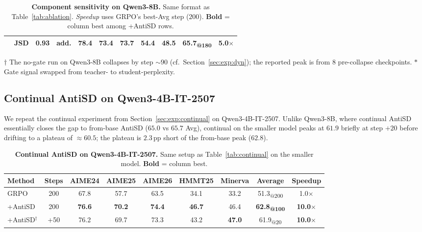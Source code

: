 \documentclass{llmxive}
\providecommand{\arraystretch}{0.95}
\begin{document}
\begin{table}[t]
\begin{tabular}{l|ccc|cccccc|c}
    \rowcolor{antisdrow}{}   & {JSD}        & {0.93}                              & {add.}                       & \textbf{78.4}   & \textbf{73.4}   & 73.7            & 54.4            & 48.5             & 65.7\textsubscript{@180}                           & 5.0$\times$          \\
    \bottomrule
  \end{tabular}
  \par\smallskip
  {\footnotesize $\dagger$ The no-gate run on Qwen3-8B collapses by step $\sim 90$ (cf.\ Section~\ref{sec:exp:dyn}); the reported peak is from $8$ pre-collapse checkpoints. $\ast$ Gate signal swapped from teacher- to student-perplexity.}
\caption{\textbf{Component sensitivity on Qwen3-8B.} Same format as Table~\ref{tab:ablation}. \emph{Speedup} uses GRPO's best-Avg step ($200$). \textbf{Bold} = column best among +AntiSD rows.}
\label{tab:ablation-qn}
\end{table}


\subsection{Continual AntiSD on Qwen3-4B-IT-2507}
\label{app:continual-q4}

We repeat the continual experiment from Section~\ref{sec:exp:continual} on Qwen3-4B-IT-2507. Unlike Qwen3-8B, where continual AntiSD essentially closes the gap to from-base AntiSD ($65.0$ vs $65.7$ Avg), continual on the smaller model peaks at $61.9$ briefly at step $+20$ before drifting to a plateau of $\approx 60.5$; the plateau is $2.3$\,pp short of the from-base peak ($62.8$).

\begin{table}[!htbp]
  \centering
  \small
  \setlength{\tabcolsep}{6pt}
  \renewcommand{\arraystretch}{1.0}
  \begin{tabular}{l|c|ccccc|c|c}
    \toprule
    \textbf{Method}                       & \textbf{Steps} & \textbf{AIME24} & \textbf{AIME25} & \textbf{AIME26} & \textbf{HMMT25} & \textbf{Minerva} & \textbf{Average}                  & \textbf{Speedup}      \\
    \midrule
    GRPO                                  & 200            & 67.8            & 57.7            & 63.5            & 34.1            & 33.2             & 51.3\textsubscript{@200}          & 1.0$\times$           \\
    +AntiSD                               & 200            & \textbf{76.6}   & \textbf{70.2}   & \textbf{74.4}   & \textbf{46.7}   & 46.4             & \textbf{62.8\textsubscript{@100}} & \textbf{10.0$\times$} \\
    \rowcolor{antisdrow} +AntiSD$^{\dag}$ & +50            & 76.2            & 69.7            & 73.3            & 43.2            & \textbf{47.0}    & 61.9\textsubscript{@20}           & \textbf{10.0$\times$} \\
    \bottomrule
  \end{tabular}
\caption{\textbf{Continual AntiSD on Qwen3-4B-IT-2507.} Same setup as Table~\ref{tab:continual} on the smaller model. \textbf{Bold} = column best.}
\label{tab:continual-q4}
\end{table}
\end{document}
